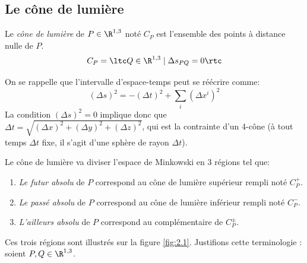 {\subsection{Le cône de lumière}
\vspace{5pt}
\begin{theoremframe}
    \begin{defi}
        Le \textit{cône de lumière} de $P \in \R^{1,3}$ noté $C_P$ est l'ensemble des points à distance nulle de $P$.
        \begin{equation}
            C_P = \ltc Q \in \R^{1,3} \mid \Delta s_{PQ} = 0\rtc
        \end{equation}

    \end{defi}
\end{theoremframe}
On se rappelle que l'intervalle d'espace-temps peut se réécrire comme:
\begin{equation}
    (\Delta s)^2 = -(\Delta t)^2 + \sum_{i}(\Delta x^{i})^2
\end{equation}
La condition $(\Delta s)^2 = 0$ implique donc que $\Delta t =
\sqrt{(\Delta x)^2 + (\Delta y)^2 + (\Delta z)^2}$, qui est la contrainte d'un 4-cône (à tout temps $\Delta t$ fixe, il s'agit d'une sphère de rayon $\Delta t$).

\begin{theoremframe}
    \begin{notat}
        Le cône de lumière va diviser l'espace de Minkowski en 3 régions tel que:
        \begin{enumerate}[label = \roman*.]
            \item \textit{Le futur absolu} de $P$ correspond au cône de lumière supérieur rempli noté $C_{P}^{+}$.
            \item \textit{Le passé absolu} de $P$ correspond au cône de lumière inférieur rempli noté $C_{P}^{-}$. 
            \item \textit{L'ailleurs absolu} de $P$ correspond au complémentaire de $C_P^\pm $.
        \end{enumerate}
    \end{notat}
\end{theoremframe}
Ces trois régions sont illustrés sur la figure \ref{fig:2.1}. Justifions cette terminologie : soient $P,Q\in \R^{1,3}$.

}
